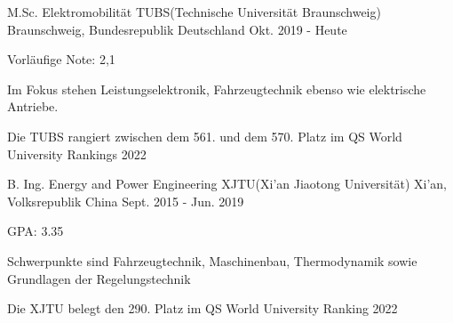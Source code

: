 

\begin{cventries}

  \cventry
  {M.Sc. Elektromobilität} %
  {TUBS(Technische Universität Braunschweig)} %
  {Braunschweig, Bundesrepublik Deutschland} %
  {Okt. 2019 - Heute} %
  {
    \begin{cvitems} %
      \item {Vorläufige Note: 2,1}
      \item {Im Fokus stehen Leistungselektronik, Fahrzeugtechnik ebenso wie elektrische Antriebe.}
      \item {Die TUBS rangiert zwischen dem 561. und dem 570. Platz im QS World University Rankings 2022}
    \end{cvitems}
  }

  \cventry
  {B. Ing. Energy and Power Engineering}
  {XJTU(Xi'an Jiaotong Universität)}
  {Xi'an, Volksrepublik China}
  {Sept. 2015 - Jun. 2019}
  {
    \begin{cvitems}
      \item {GPA: 3.35}
      \item {Schwerpunkte sind Fahrzeugtechnik, Maschinenbau, Thermodynamik sowie Grundlagen der Regelungstechnik}
      \item {Die XJTU belegt den 290. Platz im QS World University Ranking 2022}
    \end{cvitems}
  }


\end{cventries}
